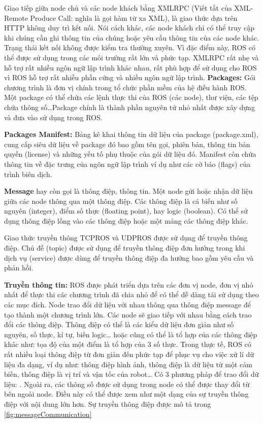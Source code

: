 {Giao tiếp giữa node chủ và các node khách bằng XMLRPC (Viết tắt của XML-Remote Produce Call: nghĩa là gọi hàm từ xa XML), là giao thức dựa trên HTTP không duy trì kết nối. Nói cách khác, các node khách chỉ có thể truy cập khi chúng cần ghi thông tin của chúng hoặc yêu cầu thông tin của các node khác. Trạng thái kết nối không được kiểm tra thường xuyên. Vì đặc điểm này, ROS có thể được sử dụng trong các môi trường rất lớn và phức tạp. XMLRPC rất nhẹ và hỗ trợ rất nhiều ngôn ngữ lập trình khác nhau, rất phù hợp để sử dụng cho ROS vì ROS hỗ trợ rất nhiều phần cứng và nhiều ngôn ngữ lập trình.
\textbf{Packages:} Gói chương trình là đơn vị chính trong tổ chức phần mềm của hệ điều hành ROS. Một package có thể chứa các lệnh thực thi của ROS (các node), thư viện, các tệp chứa thông số\dots Package chính là thành phần nguyên tử nhỏ nhất được xây dựng và đưa vào sử dụng trong ROS.

\textbf{Packages Manifest:} Bảng kê khai thông tin dữ liệu của package (package.xml), cung cấp siêu dữ liệu về package đó bao gồm tên gọi, phiên bản, thông tin bản quyền (license) và những yếu tố phụ thuộc của gói dữ liệu đó. Manifest còn chứa thông tin về đặc trưng của ngôn ngữ lập trình ví dụ như các cờ báo (flags) của trình biên dịch.

\textbf{Message} hay còn gọi là thông điệp, thông tin. Một node gửi hoặc nhận dữ liệu giữa các node thông qua một thông điệp. Các thông điệp là cá biến như số nguyên (integer), điểm số thực (floating point), hay logic (boolean). Có thể sử dụng thông điệp lồng vào các thông điệp hoặc một mảng các thông điệp khác.

Giao thức truyền thông TCPROS và UDPROS được sử dụng để truyền thông điệp. Chủ đề (topic) được sử dụng để truyền thông điệp đơn hướng trong khi dịch vụ (service) được dùng để truyền thông điệp đa hướng bao gồm yêu cầu và phản hồi.

\textbf{Truyền thông tin: } ROS được phát triển dựa trên các đơn vị node, đơn vị nhỏ nhất để thực thi các chương trình đã chia nhỏ để có thể dễ dàng tái sử dụng theo các mục đích. Node trao đổi dữ liệu với nhau thông qua thông điệp message để tạo thành một chương trình lớn. Các node sẽ giao tiếp với nhau bằng cách trao đổi các thông điệp. Thông điệp có thể là các kiểu dữ liệu đơn giản như số nguyên, số thực, kí tự, biến logic… hoặc cũng có thể là tổ hợp của các thông điệp khác như: tọa độ của một điểm là tổ hợp của 3 số thực. Trong thực tế, ROS có rất nhiều loại thông điệp từ đơn giản đến phức tạp để phục vụ cho việc xử lí dữ liệu đa dạng, ví dụ như: thông điệp hình ảnh, thông điệp là dữ liệu từ một cảm biến, thông điệp là vị trí và vận tốc của robot…
Có 3 phương pháp để trao đổi dữ liệu: . Ngoài ra, các thông số được sử dụng trong node có thể được thay đổi từ bên ngoài node. Điều này có thể được xem như một dạng của sự truyền thông điệp với nội dung lớn hơn. Sự truyền thông điệp được mô tả trong \figurename{ \ref{fig:messageCommunication}}

}

